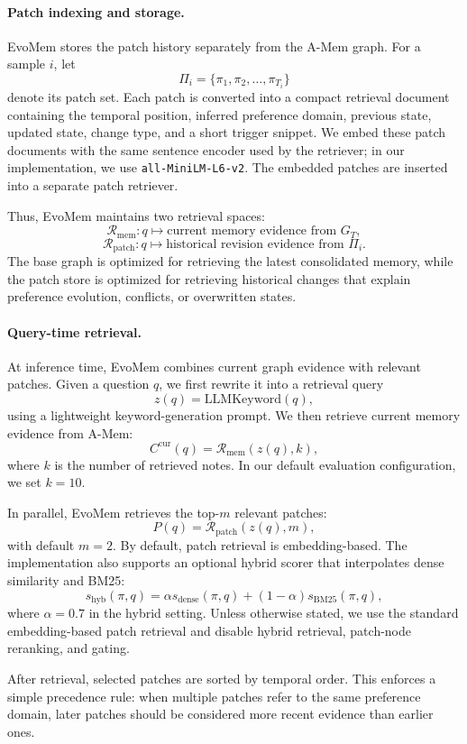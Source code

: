 \documentclass{article}
\begin{document}
\paragraph{Patch indexing and storage.}
EvoMem stores the patch history separately from the A-Mem graph. For a sample $i$, let
\[
\Pi_i=\{\pi_1,\pi_2,\ldots,\pi_{T_i}\}
\]
denote its patch set. Each patch is converted into a compact retrieval document containing the temporal position, inferred preference domain, previous state, updated state, change type, and a short trigger snippet. We embed these patch documents with the same sentence encoder used by the retriever; in our implementation, we use \texttt{all-MiniLM-L6-v2}. The embedded patches are inserted into a separate patch retriever.

Thus, EvoMem maintains two retrieval spaces:
\[
\mathcal{R}_{\mathrm{mem}}: q \mapsto \text{current memory evidence from } G_T,
\]
\[
\mathcal{R}_{\mathrm{patch}}: q \mapsto \text{historical revision evidence from } \Pi_i.
\]
The base graph is optimized for retrieving the latest consolidated memory, while the patch store is optimized for retrieving historical changes that explain preference evolution, conflicts, or overwritten states.

\paragraph{Query-time retrieval.}
At inference time, EvoMem combines current graph evidence with relevant patches. Given a question $q$, we first rewrite it into a retrieval query
\[
z(q)=\mathrm{LLMKeyword}(q),
\]
using a lightweight keyword-generation prompt. We then retrieve current memory evidence from A-Mem:
\[
C^{\mathrm{cur}}(q)=\mathcal{R}_{\mathrm{mem}}(z(q),k),
\]
where $k$ is the number of retrieved notes. In our default evaluation configuration, we set $k=10$.

In parallel, EvoMem retrieves the top-$m$ relevant patches:
\[
P(q)=\mathcal{R}_{\mathrm{patch}}(z(q),m),
\]
with default $m=2$. By default, patch retrieval is embedding-based. The implementation also supports an optional hybrid scorer that interpolates dense similarity and BM25:
\[
s_{\mathrm{hyb}}(\pi,q)
=
\alpha s_{\mathrm{dense}}(\pi,q)
+
(1-\alpha)s_{\mathrm{BM25}}(\pi,q),
\]
where $\alpha=0.7$ in the hybrid setting. Unless otherwise stated, we use the standard embedding-based patch retrieval and disable hybrid retrieval, patch-node reranking, and gating.

After retrieval, selected patches are sorted by temporal order. This enforces a simple precedence rule: when multiple patches refer to the same preference domain, later patches should be considered more recent evidence than earlier ones.
\end{document}
